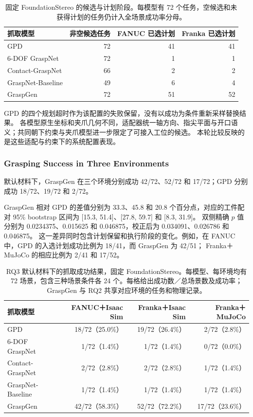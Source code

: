 \documentclass[UTF8,fontset=fandol,a4paper,11pt]{ctexart}
\begin{document}
\begin{table}[H]
\centering\small
\caption{固定 FoundationStereo 的候选与计划阶段。每模型有 72 个任务，空候选和未获得计划的任务仍计入全场景成功率分母。}
\label{tab:rq3-plans}
\begin{tabularx}{\linewidth}{Y r r r}
\toprule
抓取模型 & 非空候选任务 & FANUC 已选计划 & Franka 已选计划 \\
\midrule
GPD & 72 & 41 & 41 \\
6-DOF GraspNet & 72 & 1 & 1 \\
Contact-GraspNet & 66 & 2 & 2 \\
GraspNet-Baseline & 49 & 6 & 4 \\
GraspGen & 72 & 51 & 52 \\
\bottomrule
\end{tabularx}
\end{table}

GPD 的四个规划超时作为该配置的失败保留，没有以成功为条件重新采样替换结果。
各模型原生坐标和夹爪几何不同，适配器统一轴方向、指尖平面与开口语义；共同朝下约束与夹爪模型进一步限定了可接入工位的候选。
本轮比较反映的是这些适配与约束下的系统配置表现。

\subsubsection{Grasping Success in Three Environments}

默认材料下，GraspGen 在三个环境分别成功 42/72、52/72 和 17/72；GPD 分别成功 18/72、19/72 和 2/72。

GraspGen 相对 GPD 的差值分别为 33.3、45.8 和 20.8 个百分点，对应的工件配对 95\% bootstrap 区间为 [15.3, 51.4]、[27.8, 59.7] 和 [8.3, 31.9]。
双侧精确 $p$ 值分别为 0.0234375、0.015625 和 0.046875，校正后为 0.034091、0.026786 和 0.046875。
这一差异同时包含计划保留和执行阶段的变化。例如，在 FANUC 中，GPD 的入选计划成功比例为 18/41，而 GraspGen 为 42/51；
Franka＋MuJoCo 的相应比例为 2/41 和 17/52。

\begin{table}[H]
\centering\small
\caption{RQ3 默认材料下的抓取成功结果，固定 FoundationStereo。每模型、每环境均有 72 场景，包含三种场景条件各 24 个。每格给出成功数／总场景数及成功率；GraspGen 与 RQ2 共享对应环境的任务和物理记录。}
\label{tab:rq3}
\begin{tabularx}{\linewidth}{Y r r r}
\toprule
抓取模型 & FANUC＋Isaac Sim & Franka＋Isaac Sim & Franka＋MuJoCo \\
\midrule
GPD & 18/72（25.0\%） & 19/72（26.4\%） & 2/72（2.8\%） \\
6-DOF GraspNet & 1/72（1.4\%） & 1/72（1.4\%） & 0/72（0.0\%） \\
Contact-GraspNet & 2/72（2.8\%） & 2/72（2.8\%） & 1/72（1.4\%） \\
GraspNet-Baseline & 1/72（1.4\%） & 1/72（1.4\%） & 1/72（1.4\%） \\
GraspGen & 42/72（58.3\%） & 52/72（72.2\%） & 17/72（23.6\%） \\
\bottomrule
\end{tabularx}
\end{table}
\end{document}
